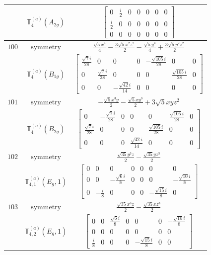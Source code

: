\documentclass[fleqn,8pt,landscape]{jsarticle}
\begin{document}
\begin{longtable}{ccc}
$  $ & $ \mathbb{T}_{4}^{(a)}(A_{2g}) $ & $ \begin{bmatrix} 0 & \frac{i}{2} & 0 & 0 & 0 & 0 & 0 \\ \frac{i}{2} & 0 & 0 & 0 & 0 & 0 & 0 \\ 0 & 0 & 0 & 0 & 0 & 0 & 0 \end{bmatrix} $ \\ \hline
$ 100 $ & $ \text{symmetry} $ & $ \frac{\sqrt{5} x^{4}}{4} - \frac{3 \sqrt{5} x^{2} z^{2}}{2} - \frac{\sqrt{5} y^{4}}{4} + \frac{3 \sqrt{5} y^{2} z^{2}}{2} $ \\
$  $ & $ \mathbb{T}_{4}^{(a)}(B_{1g}) $ & $ \begin{bmatrix} \frac{\sqrt{7} i}{28} & 0 & 0 & 0 & - \frac{\sqrt{105} i}{28} & 0 & 0 \\ 0 & \frac{\sqrt{7} i}{28} & 0 & 0 & 0 & \frac{\sqrt{105} i}{28} & 0 \\ 0 & 0 & - \frac{\sqrt{42} i}{14} & 0 & 0 & 0 & 0 \end{bmatrix} $ \\ \hline
$ 101 $ & $ \text{symmetry} $ & $ - \frac{\sqrt{5} x^{3} y}{2} - \frac{\sqrt{5} x y^{3}}{2} + 3 \sqrt{5} x y z^{2} $ \\
$  $ & $ \mathbb{T}_{4}^{(a)}(B_{2g}) $ & $ \begin{bmatrix} 0 & - \frac{\sqrt{7} i}{28} & 0 & 0 & 0 & \frac{\sqrt{105} i}{28} & 0 \\ \frac{\sqrt{7} i}{28} & 0 & 0 & 0 & \frac{\sqrt{105} i}{28} & 0 & 0 \\ 0 & 0 & 0 & \frac{\sqrt{42} i}{14} & 0 & 0 & 0 \end{bmatrix} $ \\ \hline
$ 102 $ & $ \text{symmetry} $ & $ \frac{\sqrt{35} y^{3} z}{2} - \frac{\sqrt{35} y z^{3}}{2} $ \\
$  $ & $ \mathbb{T}_{4,1}^{(a)}(E_{g},1) $ & $ \begin{bmatrix} 0 & 0 & 0 & 0 & 0 & 0 & 0 \\ 0 & 0 & - \frac{\sqrt{6} i}{8} & 0 & 0 & 0 & - \frac{\sqrt{10} i}{8} \\ 0 & - \frac{i}{8} & 0 & 0 & 0 & - \frac{\sqrt{15} i}{8} & 0 \end{bmatrix} $ \\ \hline
$ 103 $ & $ \text{symmetry} $ & $ \frac{\sqrt{35} x^{3} z}{2} - \frac{\sqrt{35} x z^{3}}{2} $ \\
$  $ & $ \mathbb{T}_{4,2}^{(a)}(E_{g},1) $ & $ \begin{bmatrix} 0 & 0 & \frac{\sqrt{6} i}{8} & 0 & 0 & 0 & - \frac{\sqrt{10} i}{8} \\ 0 & 0 & 0 & 0 & 0 & 0 & 0 \\ \frac{i}{8} & 0 & 0 & 0 & - \frac{\sqrt{15} i}{8} & 0 & 0 \end{bmatrix} $ \\ \hline

\end{longtable}
\end{document}
